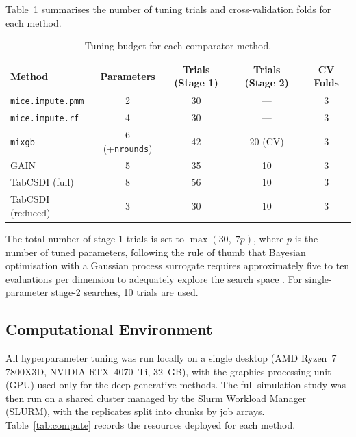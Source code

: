 Table~\ref{tab:tune_budget} summarises the number of tuning trials and cross-validation folds for each method.

\begin{table}[ht]
\centering
\caption{Tuning budget for each comparator method.}
\label{tab:tune_budget}
\setlength{\tabcolsep}{4pt}
\begin{tabular}{lcccc}
\toprule
Method & Parameters & Trials (Stage 1) & Trials (Stage 2) & CV Folds \\
\midrule
\texttt{mice.impute.pmm} & 2 & 30 & --- & 3 \\
\texttt{mice.impute.rf} & 4 & 30 & --- & 3 \\
\texttt{mixgb} & 6 (+\texttt{nrounds}) & 42 & 20 (CV) & 3 \\
GAIN & 5 & 35 & 10 & 3 \\
TabCSDI (full) & 8 & 56 & 10 & 3 \\
TabCSDI (reduced) & 3 & 30 & 10 & 3 \\
\bottomrule
\end{tabular}
\end{table}

The total number of stage-1 trials is set to $\max(30,\; 7p)$, where $p$ is the number of tuned parameters, following the rule of thumb that Bayesian optimisation with a Gaussian process surrogate requires approximately five to ten evaluations per dimension to adequately explore the search space \citep{bischl2024hyperparameter}. For single-parameter stage-2 searches, 10 trials are used.

\subsection{Computational Environment}
\label{app:compute}

All hyperparameter tuning was run locally on a single desktop (AMD Ryzen~7 7800X3D, NVIDIA RTX~4070~Ti, 32~GB), with the graphics processing unit (GPU) used only for the deep generative methods. The full simulation study was then run on a shared cluster managed by the Slurm Workload Manager (SLURM), with the replicates split into chunks by job arrays. Table~\ref{tab:compute} records the resources deployed for each method.

